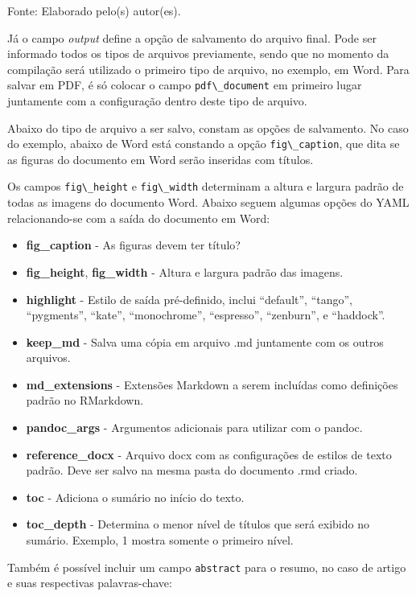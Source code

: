 \documentclass[12pt,brazil,]{book}
\begin{document}
Fonte: Elaborado pelo(s) autor(es).

Já o campo \emph{output} define a opção de salvamento do arquivo final.
Pode ser informado todos os tipos de arquivos previamente, sendo que no
momento da compilação será utilizado o primeiro tipo de arquivo, no
exemplo, em Word. Para salvar em PDF, é só colocar o campo
\texttt{pdf\textbackslash{}\_document} em primeiro lugar juntamente com
a configuração dentro deste tipo de arquivo.

Abaixo do tipo de arquivo a ser salvo, constam as opções de salvamento.
No caso do exemplo, abaixo de Word está constando a opção
\texttt{fig\textbackslash{}\_caption}, que dita se as figuras do
documento em Word serão inseridas com títulos.

Os campos \texttt{fig\textbackslash{}\_height} e
\texttt{fig\textbackslash{}\_width} determinam a altura e largura padrão
de todas as imagens do documento Word. Abaixo seguem algumas opções do
YAML relacionando-se com a saída do documento em Word:

\begin{itemize}
\item
  \textbf{fig\_caption} - As figuras devem ter título?
\item
  \textbf{fig\_height}, \textbf{fig\_width} - Altura e largura padrão
  das imagens.
\item
  \textbf{highlight} - Estilo de saída pré-definido, inclui ``default'',
  ``tango'', ``pygments'', ``kate'', ``monochrome'', ``espresso'',
  ``zenburn'', e ``haddock''.
\item
  \textbf{keep\_md} - Salva uma cópia em arquivo .md juntamente com os
  outros arquivos.
\item
  \textbf{md\_extensions} - Extensões Markdown a serem incluídas como
  definições padrão no RMarkdown.
\item
  \textbf{pandoc\_args} - Argumentos adicionais para utilizar com o
  pandoc.
\item
  \textbf{reference\_docx} - Arquivo docx com as configurações de
  estilos de texto padrão. Deve ser salvo na mesma pasta do documento
  .rmd criado.
\item
  \textbf{toc} - Adiciona o sumário no início do texto.
\item
  \textbf{toc\_depth} - Determina o menor nível de títulos que será
  exibido no sumário. Exemplo, 1 mostra somente o primeiro nível.
\end{itemize}

Também é possível incluir um campo \texttt{abstract} para o resumo, no
caso de artigo e suas respectivas palavras-chave:
\end{document}
